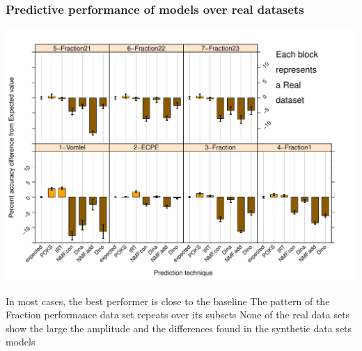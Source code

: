 \documentclass{beamer}
\begin{document}
\begin{frame}\frametitle{Predictive performance of models over real datasets}
\vspace{-0.5cm}
\includegraphics[scale =0.4] {images/Real}
\begin{overprint}
       In most cases, the best performer is close to the baseline
       The pattern of the Fraction performance data set repeats over its subsets %
       None of the real data sets show the large the amplitude and the differences found in the synthetic data sets models %
\end{overprint}
\end{frame}
\end{document}
